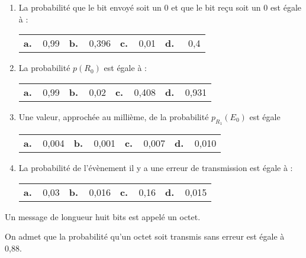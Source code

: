 \documentclass[10pt,a4paper]{article}
\begin{document}
\begin{enumerate}
\item La probabilité que le bit envoyé soit un $0$ et que le bit reçu soit un $0$ est égale à :

\begin{center}
\begin{tabularx}{\linewidth}{*{4}{X}}
\textbf{a.~~}0,99 &\textbf{b.~~}0,396 &\textbf{c.~~}0,01 &\textbf{d.~~} 0,4
\end{tabularx}
\end{center}

\item La probabilité  $p\left(R_0\right)$ est égale à :
\begin{center}
\begin{tabularx}{\linewidth}{*{4}{X}}
\textbf{a.~~}0,99 &\textbf{b.~~}0,02 &\textbf{c.~~}0,408 &\textbf{d.~~}0,931
\end{tabularx}
\end{center}
\item Une valeur, approchée au millième, de la probabilité $p_{R_1}\left(E_0\right)$ est égale 
\begin{center}
\begin{tabularx}{\linewidth}{*{4}{X}}
\textbf{a.~~}0,004 &\textbf{b.~~}0,001 &\textbf{c.~~}0,007 &\textbf{d.~~}0,010
\end{tabularx}
\end{center}
\item La probabilité de l'évènement \og  il y a une erreur de transmission \fg{} est égale à :
\begin{center}
\begin{tabularx}{\linewidth}{*{4}{X}}
\textbf{a.~~}0,03 &\textbf{b.~~}0,016 &\textbf{c.~~}0,16 &\textbf{d.~~}0,015
\end{tabularx}
\end{center}
\end{enumerate}

Un message de longueur huit bits est appelé un octet.

On admet que la probabilité qu'un octet soit transmis sans erreur est égale à 0,88.
\end{document}
